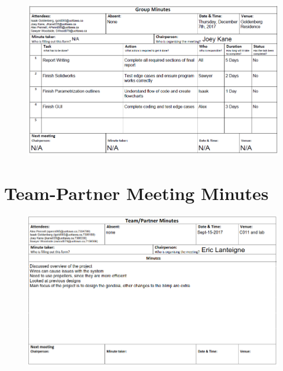 \documentclass[../main.tex]{subfiles}
\begin{document}
		\begin{figure}[H]
			\centering
			\includegraphics[height=0.8\textheight]{img/minutes/2017-12-07.PNG}
		\end{figure}
	\section{Team-Partner Meeting Minutes}
		\begin{figure}[H]
			\centering
			\includegraphics[height=0.75\textwidth]{img/minutes/2017-09-15.PNG}
		\end{figure}
\end{document}
